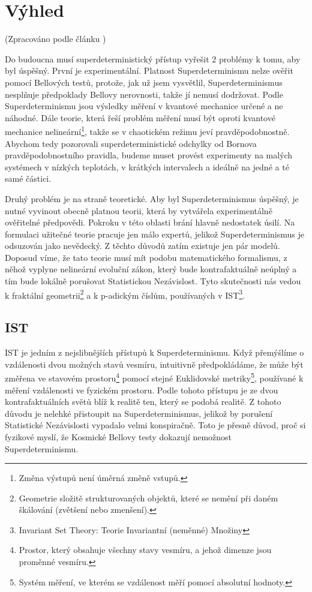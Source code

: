 \section{Výhled}
(Zpracováno podle článku \cite{supdet:rethink})

Do budoucna musí superdeterministický přístup vyřešit 2 problémy k tomu, aby byl úspěšný. První je experimentální. Platnost Superdeterminismu nelze ověřit pomocí Bellových testů, protože, jak už jsem vysvětlil, Superdeterminismus nesplňuje předpoklady Bellovy nerovnosti, takže jí nemusí dodržovat. Podle Superdeterminismu jsou výsledky měření v kvantové mechanice určené a ne náhodné. Dále teorie, která řeší problém měření musí být oproti kvantové mechanice nelineární\footnote[17]{Změna výstupů není úměrná změně vstupů.}, takže se v chaotickém režimu jeví pravděpodobnostně. Abychom tedy pozorovali superdeterministické odchylky od Bornova pravděpodobnostního pravidla, budeme muset provést experimenty na malých systémech v nízkých teplotách, v krátkých intervalech a ideálně na jedné a té samé částici. 

Druhý problém je na straně teoretické. Aby byl Superdeterminismus úspěšný, je nutné vyvinout obecně platnou teorii, která by vytvářela experimentálně ověřitelné předpovědi. Pokroku v této oblasti brání hlavně nedostatek úsilí. Na formulaci užitečné teorie pracuje jen málo expertů, jelikož Superdeterminismus je odsuzován jako nevědecký. Z těchto důvodů zatím existuje jen pár  modelů. Doposud víme, že tato teorie musí mít podobu matematického formalismu, z něhož vyplyne nelineární evoluční zákon, který bude kontrafaktuálně neúplný a tím bude lokálně porušovat Statistickou Nezávislost. Tyto skutečnosti nás vedou k fraktální geometrii\footnote[18]{Geometrie složitě strukturovaných objektů, které se nemění při daném škálování (zvětšení nebo zmenšení).} a k p-adickým číslům, používaných v IST\footnote[19]{Invariant Set Theory: Teorie Invariantní (neměnné) Množiny}. 

\subsection{IST}
IST je jedním z nejslibnějších přístupů k Superdeterminismu. Když přemýšlíme o vzdálenosti dvou možných stavů vesmíru, intuitivně předpokládáme, že může být změřena ve stavovém prostoru\footnote[20]{Prostor, který obsahuje všechny stavy vesmíru, a jehož dimenze jsou proměnné vesmíru.} pomocí stejné Euklidovské metriky\footnote[21]{Systém měření, ve kterém se vzdálenost měří pomocí absolutní hodnoty.}, používané k měření vzdálenosti ve fyzickém prostoru. Podle tohoto přístupu je ze dvou kontrafaktuálních světů blíž k realitě ten, který se  podobá realitě. Z tohoto důvodu je nelehké přistoupit na Superdeterminismus, jelikož by porušení Statistické Nezávislosti vypadalo velmi konspiračně. Toto je přesně důvod, proč si fyzikové myslí, že Kosmické Bellovy testy dokazují nemožnost Superdeterminismu. 

